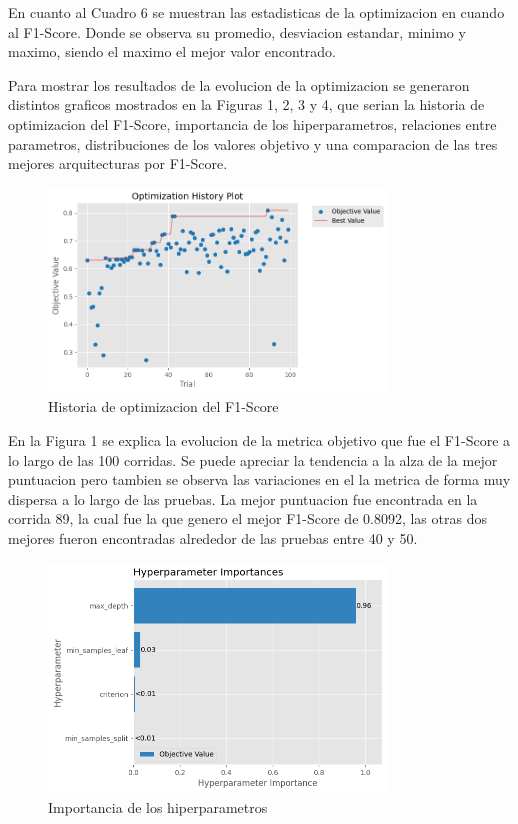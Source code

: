 \documentclass[12pt,a4paper]{article}
\begin{document}
En cuanto al Cuadro 6 se muestran las estadisticas de la optimizacion en cuando al F1-Score.
Donde se observa su promedio, desviacion estandar, minimo y maximo, siendo el maximo el mejor valor encontrado.

Para mostrar los resultados de la evolucion de la optimizacion se generaron distintos graficos mostrados en la Figuras 1, 2, 3 y 4,
que serian la historia de optimizacion del F1-Score, importancia de los hiperparametros,
relaciones entre parametros, distribuciones de los valores objetivo y una comparacion de las tres mejores arquitecturas por F1-Score.

\begin{figure}[H]
  \centering
  \includegraphics[width=0.8\textwidth]{../img/OptimizationHistory.png}
  \caption{Historia de optimizacion del F1-Score}\label{fig:decison-tree-optimization-history}
\end{figure}

En la Figura 1 se explica la evolucion de la metrica objetivo que fue el F1-Score a lo largo de las 100 corridas.
Se puede apreciar la tendencia a la alza de la mejor puntuacion pero tambien se observa las variaciones en el la
metrica de forma muy dispersa a lo largo de las pruebas.
La mejor puntuacion fue encontrada en la corrida 89, la cual fue la que genero el mejor F1-Score de 0.8092, las otras dos
mejores fueron encontradas alrededor de las pruebas entre 40 y 50.

\begin{figure}[H]
  \centering
  \includegraphics[width=0.8\textwidth]{../img/HyperparameterImportance.png}
  \caption{Importancia de los hiperparametros}\label{fig:decison-tree-hyperparameter-importance}
\end{figure}
\end{document}
